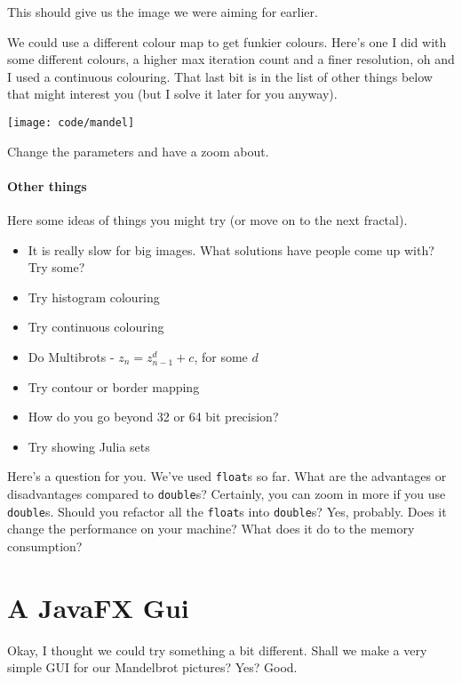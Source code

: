 \documentclass{article}
\begin{document}
            This should give us the image we were aiming for earlier.
            
            \newpage
            We could use a different colour map to get funkier colours. Here's one I did with some different colours, a higher max
            iteration count and a finer resolution, oh and I used a continuous colouring. That last bit is in the list of other things
            below that might interest you (but I solve it later for you anyway).
            
            \texttt{[image: code/mandel]}
            
            Change the parameters and have a zoom about.
        
        \paragraph{Other things}
            Here some ideas of things you might try (or move on to the next fractal).
            \begin{itemize}
                \item It is really slow for big images. What solutions have people come up with? Try some?
                \item Try histogram colouring
                \item Try continuous colouring
                \item Do Multibrots - $z_n = z_{n-1}^d + c$, for some $d$
                \item Try contour or border mapping
                \item How do you go beyond 32 or 64 bit precision?
                \item Try showing Julia sets
            \end{itemize}
            
            Here's a question for you. We've used \texttt{float}s so far. What are the advantages or disadvantages compared to
            \texttt{double}s? Certainly, you can zoom in more if you use \texttt{double}s. Should you refactor all the \texttt{float}s into
            \texttt{double}s? Yes, probably. Does it change the performance on your machine? What does it do to the memory consumption?
    
    \newpage
    \section{A JavaFX Gui}
        Okay, I thought we could try something a bit different.  Shall we make a very simple GUI for our Mandelbrot pictures?  Yes?  Good.
        
\end{document}
